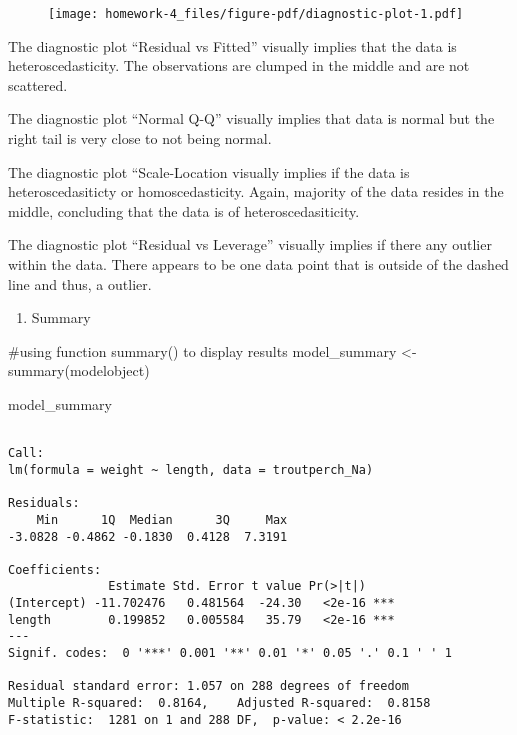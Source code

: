 \documentclass[
  letterpaper,
  DIV=11,
  numbers=noendperiod]{scrartcl}
\newenvironment{Shaded}{\begin{snugshade}}{\end{snugshade}}
\newcommand{\CommentTok}[1]{\textcolor[rgb]{0.37,0.37,0.37}{#1}}
\newcommand{\FunctionTok}[1]{\textcolor[rgb]{0.28,0.35,0.67}{#1}}
\newcommand{\NormalTok}[1]{\textcolor[rgb]{0.00,0.23,0.31}{#1}}
\newcommand{\OtherTok}[1]{\textcolor[rgb]{0.00,0.23,0.31}{#1}}
\providecommand{\tightlist}{%
  \setlength{\itemsep}{0pt}\setlength{\parskip}{0pt}}\usepackage{longtable,booktabs,array}
\begin{document}
\begin{figure}[H]

{\centering \texttt{[image: homework-4\_files/figure-pdf/diagnostic-plot-1.pdf]}

}

\end{figure}

The diagnostic plot ``Residual vs Fitted'' visually implies that the
data is heteroscedasticity. The observations are clumped in the middle
and are not scattered.

The diagnostic plot ``Normal Q-Q'' visually implies that data is normal
but the right tail is very close to not being normal.

The diagnostic plot ``Scale-Location visually implies if the data is
heteroscedasiticty or homoscedasticity. Again, majority of the data
resides in the middle, concluding that the data is of
heteroscedasiticity.

The diagnostic plot ``Residual vs Leverage'' visually implies if there
any outlier within the data. There appears to be one data point that is
outside of the dashed line and thus, a outlier.

\begin{enumerate}
\def\labelenumi{\arabic{enumi}.}
\setcounter{enumi}{5}
\tightlist
\item
  Summary
\end{enumerate}

\begin{Shaded}
\begin{Highlighting}[]
\CommentTok{\#using function summary() to display results }
\NormalTok{model\_summary }\OtherTok{\textless{}{-}} \FunctionTok{summary}\NormalTok{(modelobject)}

\NormalTok{model\_summary}
\end{Highlighting}
\end{Shaded}

\begin{verbatim}

Call:
lm(formula = weight ~ length, data = troutperch_Na)

Residuals:
    Min      1Q  Median      3Q     Max 
-3.0828 -0.4862 -0.1830  0.4128  7.3191 

Coefficients:
              Estimate Std. Error t value Pr(>|t|)    
(Intercept) -11.702476   0.481564  -24.30   <2e-16 ***
length        0.199852   0.005584   35.79   <2e-16 ***
---
Signif. codes:  0 '***' 0.001 '**' 0.01 '*' 0.05 '.' 0.1 ' ' 1

Residual standard error: 1.057 on 288 degrees of freedom
Multiple R-squared:  0.8164,    Adjusted R-squared:  0.8158 
F-statistic:  1281 on 1 and 288 DF,  p-value: < 2.2e-16
\end{verbatim}
\end{document}
